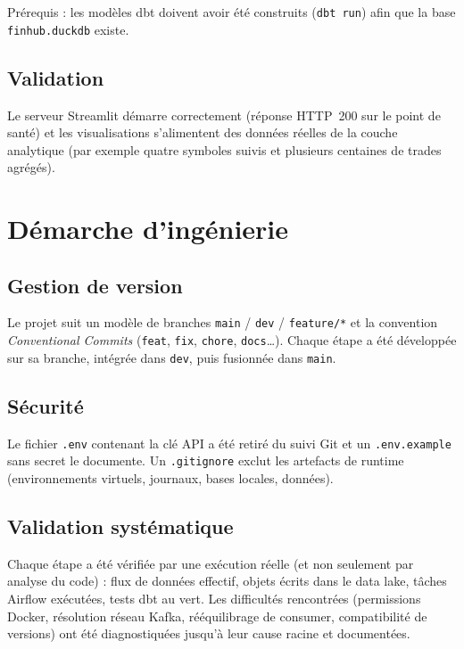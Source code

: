 \documentclass[11pt,a4paper]{article}
\newcommand{\code}[1]{\texttt{\small #1}}
\begin{document}
Prérequis : les modèles dbt doivent avoir été construits (\code{dbt run}) afin
que la base \code{finhub.duckdb} existe.

\subsection{Validation}

Le serveur Streamlit démarre correctement (réponse HTTP~200 sur le point de
santé) et les visualisations s'alimentent des données réelles de la couche
analytique (par exemple quatre symboles suivis et plusieurs centaines de trades
agrégés).

\section{Démarche d'ingénierie}

\subsection{Gestion de version}

Le projet suit un modèle de branches \code{main} / \code{dev} / \code{feature/*}
et la convention \emph{Conventional Commits} (\code{feat}, \code{fix},
\code{chore}, \code{docs}\dots). Chaque étape a été développée sur sa branche,
intégrée dans \code{dev}, puis fusionnée dans \code{main}.

\subsection{Sécurité}

Le fichier \code{.env} contenant la clé API a été retiré du suivi Git et un
\code{.env.example} sans secret le documente. Un \code{.gitignore} exclut les
artefacts de runtime (environnements virtuels, journaux, bases locales,
données).

\subsection{Validation systématique}

Chaque étape a été vérifiée par une exécution réelle (et non seulement par
analyse du code) : flux de données effectif, objets écrits dans le data lake,
tâches Airflow exécutées, tests dbt au vert. Les difficultés rencontrées
(permissions Docker, résolution réseau Kafka, rééquilibrage de consumer,
compatibilité de versions) ont été diagnostiquées jusqu'à leur cause racine et
documentées.
\end{document}
